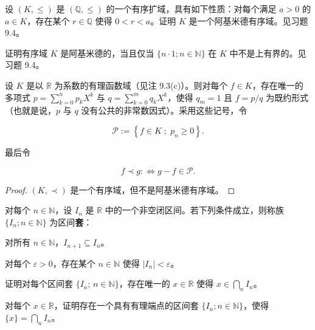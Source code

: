 \begin{exercises}
\item

设 $ (K, \leq) $ 是 $ (\mathbb{Q}, \leq) $ 的一个有序扩域，具有如下性质：对每个满足 $ a > 0 $ 的 $ a \in K $，存在某个 $ r \in \mathbb{Q} $ 使得 $ 0 < r < a $。证明 $ K $ 是一个阿基米德有序域。见习题 9.4。

\item

证明有序域 $ K $ 是阿基米德的，当且仅当 $ \{n \cdot 1; n \in \mathbb{N}\} $ 在 $ K $ 中不是上有界的。见习题 9.4。

\item

设 $ K $ 是以 $ \mathbb{R} $ 为系数的有理函数域（见注 9.3(c)）。则对每个 $ f \in K $，存在唯一的多项式 $ p = \sum_{k=0}^{n} p_k X^k $ 与 $ q = \sum_{k=0}^{m} q_k X^k $，使得 $ q_m = 1 $ 且 $ f = p/q $ 为既约形式（也就是说，$ p $ 与 $ q $ 没有公共的非常数因式）。采用这些记号，令

\[
\mathcal{P}:=\left\{f\in K\;;\;p_{n}\geq0\right\}.
\]

最后令

\[
f\prec g:\Leftrightarrow g-f\in\mathcal{P}.
\]
\end{exercises}

\begin{proof}

$ (K,\prec) $ 是一个有序域，但不是阿基米德有序域。

\end{proof}

\begin{exercises}
\item[16.]

对每个 $ n \in \mathbb{N} $，设 $ I_n $ 是 $ \mathbb{R} $ 中的一个非空闭区间。若下列条件成立，则称族 $ \{I_n; n \in \mathbb{N}\} $ 为区间\textbf{套}：

\begin{subitems}
\item

对所有 $ n \in \mathbb{N} $，$ I_{n+1} \subseteq I_n $。

\item

对每个 $ \varepsilon > 0 $，存在某个 $ n \in \mathbb{N} $ 使得 $ |I_n| < \varepsilon $。

\end{subitems}

\begin{items}
\item

证明对每个区间套 $ \{I_n;\, n \in \mathbb{N}\} $，存在唯一的 $ x \in \mathbb{R} $ 使得 $ x \in \bigcap_n I_n $。

\item

对每个 $ x \in \mathbb{R} $，证明存在一个具有有理端点的区间套 $ \{I_n; n \in \mathbb{N}\} $，使得 $ \{x\} = \bigcap_n I_n $。

\end{items}

\end{exercises}

